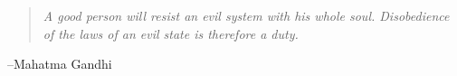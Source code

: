 \documentclass{exam}
\begin{document}
\else
  \vspace{3 cm}
  \begin{quote}
    {\em 
      A good person will resist an evil system with his whole soul. Disobedience of the laws of an evil state is
      therefore a duty.
    }    
  \end{quote}
  \hspace{1 cm} --Mahatma Gandhi

\fi
\end{document}
